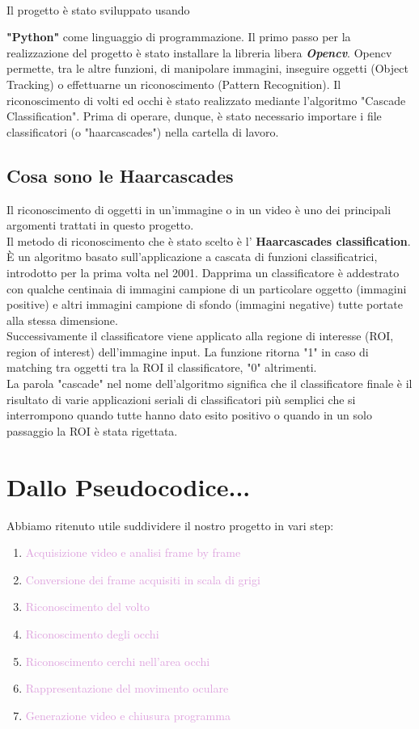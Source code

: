 \documentclass[12pt]{article}
\begin{document}
\\Il progetto \`e stato sviluppato usando {\textbf{"Python"} come linguaggio di programmazione. Il primo passo per la realizzazione del progetto \`e stato installare la libreria libera \textit{\textbf{Opencv}}. Opencv permette, tra le altre funzioni, di manipolare immagini, inseguire oggetti (Object Tracking) o effettuarne un riconoscimento (Pattern Recognition). Il riconoscimento di volti ed occhi \`e stato realizzato mediante l'algoritmo "Cascade Classification". Prima di operare, dunque, è stato necessario importare i file classificatori (o "haarcascades") nella cartella di lavoro.

	\subsection{Cosa sono le Haarcascades}
	Il riconoscimento di oggetti in un'immagine o in un video \`e uno dei principali argomenti trattati in questo progetto. \\
	Il metodo di riconoscimento che \`e stato scelto \`e l' \textbf{Haarcascades classification}. \`E un algoritmo basato sull'applicazione a cascata di funzioni classificatrici, introdotto per la prima volta nel 2001. 
	Dapprima un classificatore è addestrato con qualche centinaia di immagini campione di un particolare oggetto (immagini positive) e altri immagini campione di sfondo (immagini negative) tutte portate alla stessa dimensione. \\ Successivamente il classificatore viene applicato alla regione di interesse (ROI, region of interest) dell'immagine input. La funzione ritorna "1" in caso di matching tra oggetti tra la ROI il classificatore, "0" altrimenti. \\
	La parola "cascade" nel nome dell'algoritmo significa che il classificatore finale \`e il risultato di varie applicazioni seriali di classificatori pi\`u semplici che si interrompono quando tutte hanno dato esito positivo o quando in un solo passaggio la ROI \`e stata rigettata.
\pagebreak

\section{Dallo Pseudocodice...}
Abbiamo ritenuto utile suddividere il nostro progetto in vari step:
\begin{enumerate}
	\item \label{primo}\textcolor{Plum}{Acquisizione video e analisi frame by frame}
	\item \label{secondo} \textcolor{Plum}{Conversione dei frame acquisiti in scala di grigi}
	\item \label{terzo} \textcolor{Plum}{Riconoscimento del volto}
	\item \label{quarto}\textcolor{Plum}{Riconoscimento degli occhi}
    \item \label{quinto}\textcolor{Plum}{Riconoscimento cerchi nell'area occhi}
    \item \label{sesto}\textcolor{Plum}{Rappresentazione del movimento oculare}
    \item \label{settimo}\textcolor{Plum}{Generazione video e chiusura programma}
\end{enumerate}

}
\end{document}
